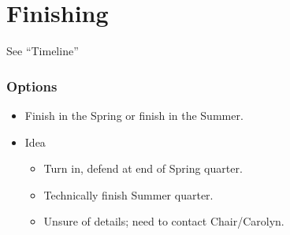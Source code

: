 \documentclass{beamer}
\begin{document}
\section{Finishing}
\begin{frame}
  \begin{huge}
    See ``Timeline''
  \end{huge}
\end{frame}

\begin{frame}
  \frametitle{Options}
  \begin{itemize}
    \item Finish in the Spring or finish in the Summer.
    \item Idea
      \begin{itemize}
        \item Turn in, defend at end of Spring quarter.
        \item Technically finish Summer quarter.
        \item Unsure of details; need to contact Chair/Carolyn.
      \end{itemize}
  \end{itemize}
\end{frame}
\end{document}
